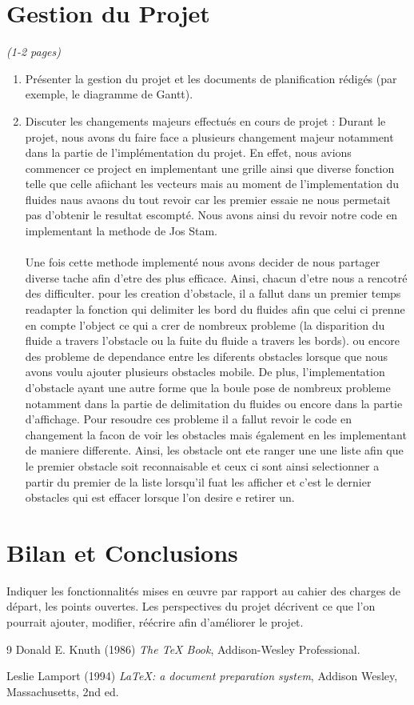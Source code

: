 \documentclass[a4paper]{article}
\begin{document}
\section{Gestion du Projet}
\emph{ (1-2 pages)}
\begin{enumerate}%
\item Présenter la gestion du projet et les documents de planification rédigés (par exemple, le diagramme de Gantt).
\item	Discuter les changements majeurs effectués en cours de projet :
Durant le projet, nous avons du faire face a plusieurs changement majeur notamment 
dans la partie de l'implémentation du projet. En effet, 
nous avions commencer ce project en implementant une grille ainsi que
diverse fonction telle que celle afiichant les vecteurs
mais au moment de l'implementation du fluides naus avaons du tout revoir
car les premier essaie ne nous permetait pas d'obtenir le resultat escompté. 
Nous avons ainsi du revoir notre code en implementant la methode de Jos Stam.
\\
\\
Une fois cette methode implementé nous avons decider de nous partager diverse 
tache afin d'etre des plus efficace. Ainsi, chacun d'etre nous a rencotré des
difficulter.
pour les creation d'obstacle, il a fallut dans un premier temps readapter la fonction
qui delimiter les bord du fluides afin que celui ci prenne en compte l'object
ce qui a crer de nombreux probleme (la disparition du fluide a travers l'obstacle ou la fuite du fluide a travers les bords).
ou encore des probleme de dependance entre les diferents obstacles lorsque que nous avons voulu
ajouter plusieurs obstacles mobile. De plus, l'implementation d'obstacle ayant une autre forme
que la boule pose de nombreux probleme notamment dans la partie de delimitation du fluides ou encore dans la partie d'affichage.
Pour resoudre ces probleme il a fallut revoir le code en changement la facon de voir 
les obstacles mais également en les implementant de maniere differente.
Ainsi, les obstacle ont ete ranger une une liste afin que le premier obstacle soit reconnaisable
et ceux ci sont ainsi selectionner a partir du premier de la liste lorsqu'il fuat
les afficher et c'est le dernier obstacles qui est effacer lorsque l'on desire e retirer un.

\end{enumerate}

\section{Bilan et Conclusions}

	Indiquer les fonctionnalités mises en œuvre par rapport au cahier des charges de départ, les points ouvertes.
	Les perspectives du projet décrivent ce que l’on pourrait ajouter, modifier, réécrire afin d’améliorer le projet. 
	
\begin{thebibliography}{9}
Donald E. Knuth (1986) \emph{The \TeX{} Book}, Addison-Wesley Professional.

Leslie Lamport (1994) \emph{\LaTeX: a document preparation system}, Addison
Wesley, Massachusetts, 2nd ed.
\end{thebibliography}
\end{document}
